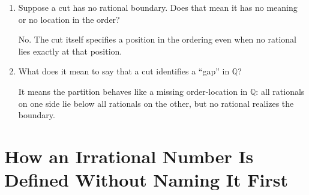 \documentclass{self-check}
\begin{document}
\begin{enumerate}[label=\arabic*., itemsep=10pt]
\item Suppose a cut has no rational boundary. Does that mean it has no meaning or no location in the order?

\begin{answer}
No. The cut itself specifies a position in the ordering even when no rational lies exactly at that position.
\end{answer}

\item What does it mean to say that a cut identifies a ``gap'' in $\mathbb{Q}$?

\begin{answer}
It means the partition behaves like a missing order-location in $\mathbb{Q}$: all rationals on one side lie below all rationals on the other, but no rational realizes the boundary.
\end{answer}

\end{enumerate}

\section{How an Irrational Number Is Defined Without Naming It First}
\end{document}
